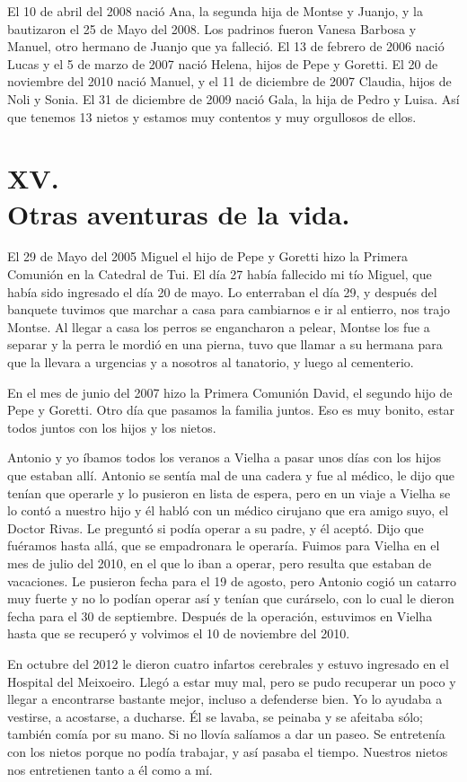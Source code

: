 \documentclass[12pt,a5paper]{book}
\begin{document}
El 10 de abril del 2008 nació Ana, la segunda hija de Montse y Juanjo, y la bautizaron el 25 de Mayo del 2008. Los padrinos fueron Vanesa Barbosa y Manuel, otro hermano de Juanjo que ya falleció. El 13 de febrero de 2006 nació Lucas y el 5 de marzo de 2007 nació Helena, hijos de Pepe y Goretti. El 20 de noviembre del 2010 nació Manuel, y el 11 de diciembre de 2007 Claudia, hijos de Noli y Sonia. El 31 de diciembre de 2009 nació Gala, la hija de Pedro y Luisa. Así que tenemos 13 nietos y estamos muy contentos y muy orgullosos de ellos.


\section*{XV.\\Otras aventuras de la vida.}


El 29 de Mayo del 2005 Miguel el hijo de Pepe y Goretti hizo la Primera Comunión en la Catedral de Tui. El día 27 había fallecido mi tío Miguel, que había sido ingresado el día 20 de mayo. Lo enterraban el día 29, y después del banquete tuvimos que marchar a casa para cambiarnos e ir al entierro, nos trajo Montse. Al llegar a casa los perros se engancharon a pelear, Montse los fue a separar y la perra le mordió en una pierna, tuvo que llamar a su hermana para que la llevara a urgencias y a nosotros al tanatorio, y luego al cementerio.

En el mes de junio del 2007 hizo la Primera Comunión David, el segundo hijo de Pepe y Goretti. Otro día que pasamos la familia juntos. Eso es muy bonito, estar todos juntos con los hijos y los nietos.

Antonio y yo íbamos todos los veranos a Vielha a pasar unos días con los hijos que estaban allí. Antonio se sentía mal de una cadera y fue al médico, le dijo que tenían que operarle y lo pusieron en lista de espera, pero en un viaje a Vielha se lo contó a nuestro hijo y él habló con un médico cirujano que era amigo suyo, el Doctor Rivas. Le preguntó si podía operar a su padre, y él aceptó. Dijo que fuéramos hasta allá, que se empadronara le operaría. Fuimos para Vielha en el mes de julio del 2010, en el que lo iban a operar, pero resulta que estaban de vacaciones. Le pusieron fecha para el 19 de agosto, pero Antonio cogió un catarro muy fuerte y no lo podían operar así y tenían que curárselo, con lo cual le dieron fecha para el 30 de septiembre. Después de la operación, estuvimos en Vielha hasta que se recuperó y volvimos el 10 de noviembre del 2010.

En octubre del 2012 le dieron cuatro infartos cerebrales y estuvo ingresado en el Hospital del Meixoeiro. Llegó a estar muy mal, pero se pudo recuperar un poco y llegar a encontrarse bastante mejor, incluso a defenderse bien. Yo lo ayudaba a vestirse, a acostarse, a ducharse. Él se lavaba, se peinaba y se afeitaba sólo; también comía por su mano. Si no llovía salíamos a dar un paseo. Se entretenía con los nietos porque no podía trabajar, y así pasaba el tiempo. Nuestros nietos nos entretienen tanto a él como a mí.
\end{document}
